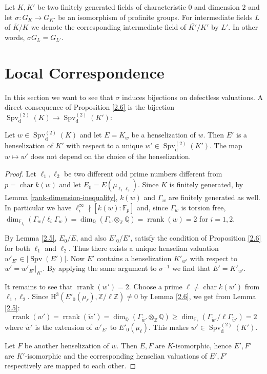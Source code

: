 Let $K,K'$ be two finitely generated fields of characteristic $0$ and dimension $2$ and let $\sigma:G_K\to G_{K'}$ be an isomorphism of profinite groups. For intermediate fields $L$ of $\overline{K}/K$ we denote the corresponding intermediate field of $\overline{K'}/K'$ by $L'$. In other words, $\sigma G_L=G_{L'}$.

\section{Local Correspondence}

In this section we want to see that $\sigma$ induces bijections on defectless valuations. A direct consequence of Proposition \ref{2.6} is the bijection $\operatorname{Spv}_\text{d}^{(2)}(K)\to \operatorname{Spv}_\text{d}^{(2)}(K')$:

\begin{lemma}\label{3.1}
Let $w\in\operatorname{Spv}_\text{d}^{(2)}(K)$ and let $E=K_w$ be a henselization of $w$. Then $E'$ is a henselization of $K'$ with respect to a unique $w'\in\operatorname{Spv}_\text{d}^{(2)}(K')$. The map $w\mapsto w'$ does not depend on the choice of the henselization.
\end{lemma}

\begin{proof}
Let $\ell_1,\ell_2$ be two different odd prime numbers different from $p=\operatorname{char} k(w)$ and let $E_0 = E(\mu_{\ell_1\ell_2})$. Since $K$ is finitely generated, by Lemma \ref{rank-dimension-inequality}, $k(w)$ and $\Gamma_w$ are finitely generated as well. In particular we have $\ell_i^\infty \nmid [k(w):\mathbb{F}_p]$ and, since $\Gamma_w$ is torsion free, $\dim_{\mathbb{F}_{\ell_i}}(\Gamma_w/{\ell_i}\Gamma_w) = \dim_{\mathbb{Q}}(\Gamma_w\otimes_{\mathbb{Z}}\mathbb{Q})= \operatorname{rrank}(w)=2$ for $i=1,2$.

By Lemma \ref{2.5}, $E_0/E$, and also $E'_0/E'$, satisfy the condition of Proposition \ref{2.6} for both $\ell_1$ and $\ell_2$. Thus there exists a unique henselian valuation $w'_{E'}\in|\operatorname{Spv}(E')|$. Now $E'$ contains a henselization $K'_{w'}$ with respect to $w' = w'_{E'}|_{K'}$. By applying the same argument to $\sigma^{-1}$ we find that $E' = K'_{w'}$.

It remains to see that $\operatorname{rrank}(w')=2$. Choose a prime $\ell\neq \operatorname{char} k(w')$ from $\ell_1,\ell_2$. Since $\mathrm{H}^3(E'_0(\mu_{\ell}),\mathbb{Z}/\ell\mathbb{Z})\neq 0$ by Lemma \ref{2.6}, we get from Lemma \ref{2.5}:
\[\operatorname{rrank}(w')= \operatorname{rrank}( \widetilde{w}') = \dim_{\mathbb{Q}}(\Gamma_{\widetilde{w}'}\otimes_\mathbb{Z}\mathbb{Q}) \geq \dim_{\mathbb{F}_\ell}(\Gamma_{\widetilde{w}'}/\ell\Gamma_{\widetilde{w}'})=2\]
where $\widetilde{w}'$ is the extension of $w'_{E'}$ to $E'_0(\mu_{\ell})$. This makes $w'\in\operatorname{Spv}^{(2)}_\text{d}(K')$. 

Let $F$ be another henselization of $w$. Then $E, F$ are $K$-isomorphic, hence $E',F'$ are $K'$-isomorphic and the corresponding henselian valuations of $E', F'$ respectively are mapped to each other.
\end{proof}

